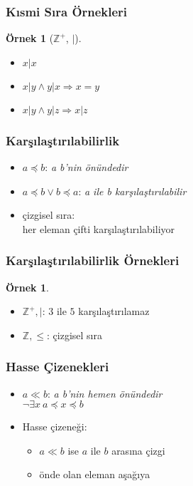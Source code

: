 \documentclass[dvipsnames]{beamer}
\theoremstyle{definition}
\theoremstyle{example}
\newtheorem{ornek}[theorem]{Örnek}
\theoremstyle{plain}
\begin{document}
\begin{frame}
  \frametitle{Kısmi Sıra Örnekleri}

  \begin{ornek}[$\mathbb{Z}^+$, $|$]
    \begin{itemize}
      \item $x | x$
      \item $x | y \wedge y | x \Rightarrow x = y$
      \item $x | y \wedge y | z \Rightarrow x | z$
    \end{itemize}
  \end{ornek}
\end{frame}

\begin{frame}
  \frametitle{Karşılaştırılabilirlik}

  \begin{itemize}
    \item $a \preceq b$: \emph{a b'nin önündedir}

    \medskip
    \item $a \preceq b \vee b \preceq a$: \emph{a ile b karşılaştırılabilir}

    \pause
    \bigskip
    \item \alert{çizgisel sıra}:\\
      her eleman çifti karşılaştırılabiliyor
  \end{itemize}
\end{frame}

\begin{frame}
  \frametitle{Karşılaştırılabilirlik Örnekleri}

  \begin{ornek}
    \begin{itemize}
      \item $\mathbb{Z}^+,|$: $3$ ile $5$ karşılaştırılamaz

      \pause
      \medskip
      \item $\mathbb{Z},\leq$: çizgisel sıra
    \end{itemize}
  \end{ornek}
\end{frame}

\begin{frame}
  \frametitle{Hasse Çizenekleri}

  \begin{itemize}
    \item $a \ll b$: \emph{a b'nin hemen önündedir}\\
      $\neg \exists x~ a \preceq x \preceq b$

    \pause
    \medskip
    \item Hasse çizeneği:
    \begin{itemize}
      \item $a \ll b$ ise $a$ ile $b$ arasına çizgi
      \item önde olan eleman aşağıya
    \end{itemize}
  \end{itemize}
\end{frame}
\end{document}
